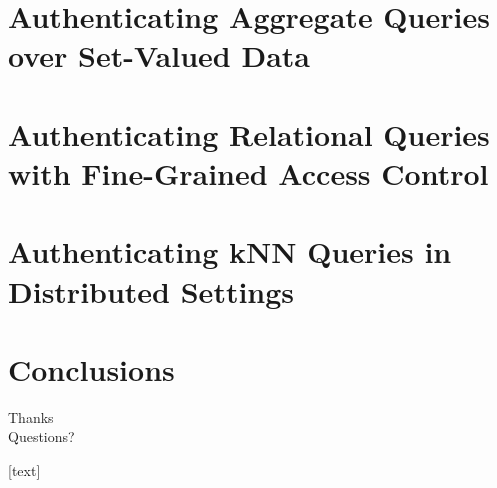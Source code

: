 \documentclass[xcolor={dvipsnames},aspectratio=169,10pt]{beamer}
\begin{document}
\section{Authenticating Aggregate Queries over Set-Valued Data}

\section{Authenticating Relational Queries with Fine-Grained Access Control}

\section{Authenticating {kNN} Queries in Distributed Settings}

\section{Conclusions}

\begin{frame}[standout]
  Thanks \\
  Questions?
\end{frame}

\appendix%

\begingroup
{}
\begin{frame}[t,allowframebreaks]{\refname}
  [text]
  \renewcommand*{\bibfont}{\scriptsize}
  \printbibliography[heading=none]%
\end{frame}
\endgroup
\end{document}
